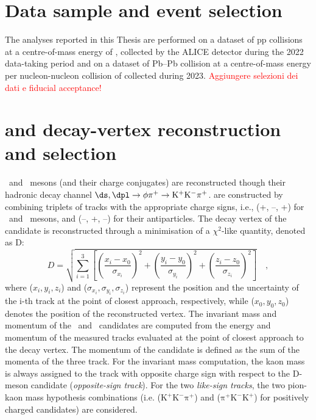 \section{Data sample and event selection}
The analyses reported in this Thesis are performed on a dataset of pp collisions at a centre-of-mass energy of \thirteen, collected by the ALICE detector during the 2022 data-taking period and on a dataset of Pb--Pb collision at a centre-of-mass energy per nucleon-nucleon collision of \fivenn collected during 2023. \textcolor{red}{Aggiungere selezioni dei dati e fiducial acceptance!}

\section{\ds and \dpl decay-vertex reconstruction and selection}
\ds\ and \dpl\ mesons (and their charge conjugates) are reconstructed though their hadronic decay channel $\ds, \dpl \rightarrow \mathrm{\phi\pi^+ \rightarrow K^+K^-\pi^+}$. are constructed by combining triplets of tracks with the appropriate charge signs, i.e., (+, --, +) for \ds\ and \dpl\ mesons, and (--, +, --) for their antiparticles. The decay vertex of the candidate is reconstructed through a minimisation of a $\chi^2$-like quantity, denoted as D:
\begin{equation}
    D = \sqrt{\sum_{i=1}^3 \left[\left(\frac{x_i-x_0}{\sigma_{x_i}}\right)^2 + \left(\frac{y_i-y_0}{\sigma_{y_i}}\right)^2 +\left(\frac{z_i-z_0}{\sigma_{z_i}}\right)^2\right]}\quad ,
\end{equation}
where ($x_i,y_i,z_i$) and ($\sigma_{x_i},\sigma_{y_i},\sigma_{z_i}$) represent the position and the uncertainty of the i-th track at the point of closest approach, respectively, while ($x_0,y_0,z_0$) denotes the position of the reconstructed vertex. The invariant mass and momentum of the \ds\ and \dpl\ candidates are computed from the energy and momentum of the measured tracks evaluated at the point of closest approach to the decay vertex. The momentum of the candidate is defined as the sum of the momenta of the three track. For the invariant mass computation, the kaon mass is always assigned to the track with opposite charge sign with respect to the D-meson candidate (\emph{opposite-sign track}). For the two \emph{like-sign tracks}, the two pion-kaon mass hypothesis combinations \big(i.e. ($\mathrm{K^+K^-\pi^+}$) and ($\mathrm{\pi^+K^-K^+}$) for positively charged candidates\big) are considered. 

